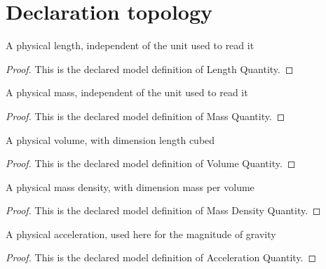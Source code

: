 \section{Declaration topology}
\begin{definition}
  \label{def:physics:phyx-mini-0453:phyxminiproblems-problemphyxmini0453-lengthquantity}
  A physical length, independent of the unit used to read it
\end{definition}
\begin{proof}
  This is the declared model definition of Length Quantity.
\end{proof}
\begin{definition}
  \label{def:physics:phyx-mini-0453:phyxminiproblems-problemphyxmini0453-massquantity}
  A physical mass, independent of the unit used to read it
\end{definition}
\begin{proof}
  This is the declared model definition of Mass Quantity.
\end{proof}
\begin{definition}
  \label{def:physics:phyx-mini-0453:phyxminiproblems-problemphyxmini0453-volumequantity}
  A physical volume, with dimension length cubed
\end{definition}
\begin{proof}
  This is the declared model definition of Volume Quantity.
\end{proof}
\begin{definition}
  \label{def:physics:phyx-mini-0453:phyxminiproblems-problemphyxmini0453-massdensityquantity}
  A physical mass density, with dimension mass per volume
\end{definition}
\begin{proof}
  This is the declared model definition of Mass Density Quantity.
\end{proof}
\begin{definition}
  \label{def:physics:phyx-mini-0453:phyxminiproblems-problemphyxmini0453-accelerationquantity}
  A physical acceleration, used here for the magnitude of gravity
\end{definition}
\begin{proof}
  This is the declared model definition of Acceleration Quantity.
\end{proof}
